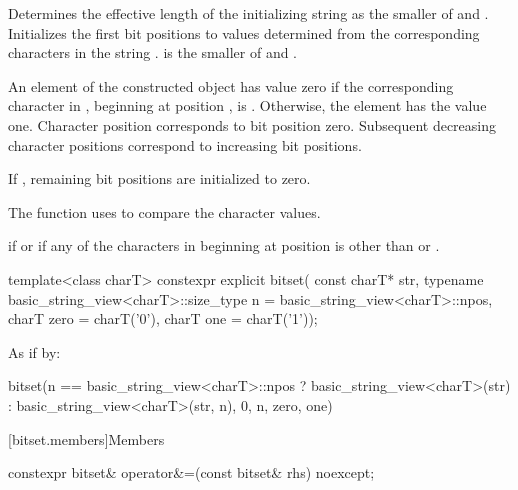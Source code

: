 \begin{itemdescr}
\pnum
\effects
Determines the effective length
 of the initializing string as the smaller of
 and
.
Initializes the first  bit
positions to values determined from the corresponding characters in the string
.
 is the smaller of  and .

\pnum
An element of the constructed object has value zero if the
corresponding character in , beginning at position
, is
.
Otherwise, the element has the value one.
Character position  corresponds to bit position zero.
Subsequent decreasing character positions correspond to increasing bit positions.

\pnum
If , remaining bit positions are initialized to zero.

\pnum
The function uses 
to compare the character values.

\pnum
\throws
{}%
 if  or
%
 if any of
the  characters in 
beginning at position 
is other than  or .
\end{itemdescr}

%
\begin{itemdecl}
template<class charT>
  constexpr explicit bitset(
    const charT* str,
    typename basic_string_view<charT>::size_type n = basic_string_view<charT>::npos,
    charT zero = charT('0'),
    charT one = charT('1'));
\end{itemdecl}

\begin{itemdescr}
\pnum
\effects
As if by:
\begin{codeblock}
bitset(n == basic_string_view<charT>::npos
          ? basic_string_view<charT>(str)
          : basic_string_view<charT>(str, n),
       0, n, zero, one)
\end{codeblock}
\end{itemdescr}


[bitset.members]{Members}

%
\begin{itemdecl}
constexpr bitset& operator&=(const bitset& rhs) noexcept;
\end{itemdecl}

